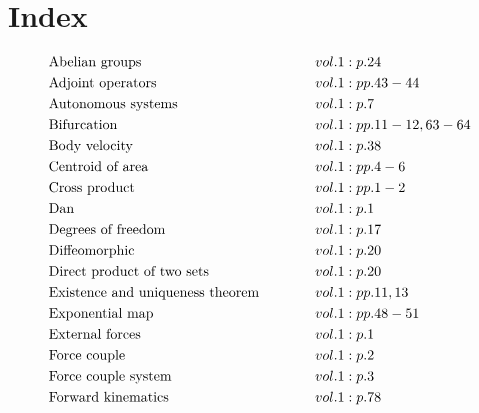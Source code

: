 \documentclass[a4paper]{article}
\begin{document}
 
\section*{Index} 
\allowdisplaybreaks 
\begin{align*} 
&\text{Abelian groups} \hspace*{3em}&& vol. 1: p. 24\\
&\text{Adjoint operators} \hspace*{3em}&& vol. 1: pp. 43-44\\
&\text{Autonomous systems} \hspace*{3em}&& vol. 1: p. 7\\
&\text{Bifurcation} \hspace*{3em}&& vol. 1: pp. 11-12, 63-64\\
&\text{Body velocity} \hspace*{3em}&& vol. 1: p. 38\\
&\text{Centroid of area} \hspace*{3em}&& vol. 1: pp. 4-6\\
&\text{Cross product} \hspace*{3em}&& vol. 1: pp. 1-2\\
&\text{Dan} \hspace*{3em}&& vol. 1: p. 1\\
&\text{Degrees of freedom} \hspace*{3em}&& vol. 1: p. 17\\
&\text{Diffeomorphic} \hspace*{3em}&& vol. 1: p. 20\\
&\text{Direct product of two sets} \hspace*{3em}&& vol. 1: p. 20\\
&\text{Existence and uniqueness theorem} \hspace*{3em}&& vol. 1: pp. 11, 13\\
&\text{Exponential map} \hspace*{3em}&& vol. 1: pp. 48-51\\
&\text{External forces} \hspace*{3em}&& vol. 1: p. 1\\
&\text{Force couple} \hspace*{3em}&& vol. 1: p. 2\\
&\text{Force couple system} \hspace*{3em}&& vol. 1: p. 3\\
&\text{Forward kinematics} \hspace*{3em}&& vol. 1: p. 78\\

\end{align*}
\end{document}
